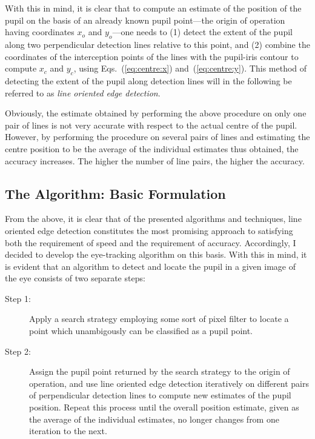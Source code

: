With this in mind, it is clear that to compute an estimate of the
position of the pupil on the basis of an already known pupil
point---the origin of operation having coordinates $x_{o}$ and
$y_{o}$---one needs to (1) detect the extent of the pupil along two
perpendicular detection lines relative to this point, and (2) combine
the coordinates of the interception points of the lines with the
pupil-iris contour to compute $x_{c}$ and $y_{c}$, using
Eqs.~(\ref{eq:centre:x}) and~(\ref{eq:centre:y}).  This method of
detecting the extent of the pupil along detection lines will in the
following be referred to as {\em line oriented edge detection\/}.

Obviously, the estimate obtained by performing the above procedure on
only one pair of lines is not very accurate with respect to the actual
centre of the pupil.  However, by performing the procedure on several
pairs of lines and estimating the centre position to be the average of
the individual estimates thus obtained, the accuracy increases.  The
higher the number of line pairs, the higher the accuracy.

\subsection{The Algorithm: Basic Formulation}
\label{eval:approach:algo}

From the above, it is clear that of the presented algorithms and
techniques, line oriented edge detection constitutes the most
promising approach to satisfying both the requirement of speed and the
requirement of accuracy.  Accordingly, I decided to develop the
eye-tracking algorithm on this basis.  With this in mind, it is
evident that an algorithm to detect and locate the pupil in a given
image of the eye consists of two separate steps:

\begin{description}
\item[Step 1:] Apply a search strategy employing some sort of pixel
  filter to locate a point which unambigously can be classified as a
  pupil point.
\item[Step 2:] Assign the pupil point returned by the search strategy
  to the origin of operation, and use line oriented edge detection
  iteratively on different pairs of perpendicular detection lines to
  compute new estimates of the pupil position.  Repeat this process
  until the overall position estimate, given as the average of the
  individual estimates, no longer changes from one iteration to the
  next.
\end{description}

